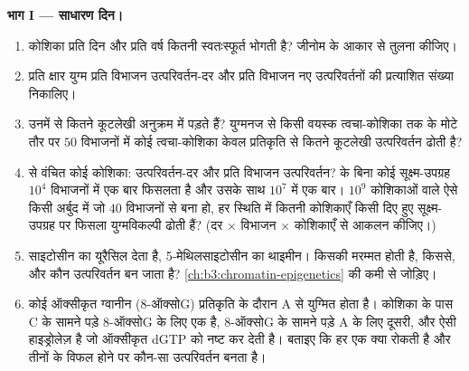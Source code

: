 \begin{problem}
\medskip
\noindent\textbf{भाग I --- साधारण दिन।}
\begin{enumerate}
  \item कोशिका प्रति दिन और प्रति वर्ष कितनी स्वतःस्फूर्त 
        भोगती है? जीनोम के आकार से तुलना कीजिए।
  \item प्रति क्षार युग्म प्रति विभाजन उत्परिवर्तन-दर और प्रति विभाजन
        नए उत्परिवर्तनों की प्रत्याशित संख्या निकालिए।
  \item उनमें से कितने कूटलेखी अनुक्रम में पड़ते हैं? युग्मनज से किसी
        वयस्क त्वचा-कोशिका तक के मोटे तौर पर $50$ विभाजनों में कोई
        त्वचा-कोशिका केवल प्रतिकृति से कितने कूटलेखी उत्परिवर्तन ढोती
        है?
  \item {} से वंचित कोई कोशिका: उत्परिवर्तन-दर और प्रति
        विभाजन उत्परिवर्तन?  के बिना कोई सूक्ष्म-उपग्रह
        $10^{4}$ विभाजनों में एक बार फिसलता है और उसके साथ $10^{7}$
        में एक बार। $10^{9}$ कोशिकाओं वाले ऐसे किसी अर्बुद में जो $40$
        विभाजनों से बना हो, हर स्थिति में कितनी कोशिकाएँ किसी दिए हुए
        सूक्ष्म-उपग्रह पर फिसला युग्मविकल्पी ढोती हैं? (दर $\times$
        विभाजन $\times$ कोशिकाएँ से आकलन कीजिए।)
  \item साइटोसीन का  यूरैसिल देता है, 5-मेथिलसाइटोसीन का थाइमीन।
        किसकी मरम्मत होती है, किससे, और कौन उत्परिवर्तन बन जाता है?
        \cref{ch:b3:chromatin-epigenetics} की  कमी से जोड़िए।
  \item कोई ऑक्सीकृत ग्वानीन (8-ऑक्सोG) प्रतिकृति के दौरान A से
        युग्मित होता है। कोशिका के पास C के सामने पड़े 8-ऑक्सोG के लिए
        एक  है, 8-ऑक्सोG के सामने पड़े A के लिए दूसरी, और
        ऐसी हाइड्रोलेज़ है जो ऑक्सीकृत dGTP को नष्ट कर देती है। बताइए
        कि हर एक क्या रोकती है और तीनों के विफल होने पर कौन-सा
        उत्परिवर्तन बनता है।
\end{enumerate}


\end{problem}
